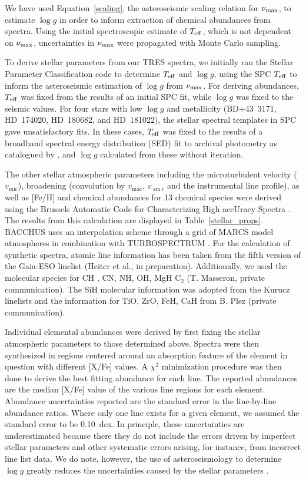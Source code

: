 \documentclass[modern]{aastex62}
\newcommand{\numax}{\mbox{$\nu_{\rm max}$}\xspace}
\newcommand{\teff}{\mbox{$T_{\rm eff}$}\xspace}
\newcommand{\logg}{\mbox{$\log g$}\xspace}
\begin{document}
We have used Equation~\ref{scaling}, the asteroseismic scaling relation for \numax \citep{1991ApJ...368..599B,KB95}, to estimate \logg in order to inform extraction of chemical abundances from spectra. Using the initial spectroscopic estimate of \teff, which is not dependent on \numax, uncertainties in \numax were propagated with Monte Carlo sampling. 

To derive stellar parameters from our TRES spectra, we initially ran the Stellar Parameter Classification code \citep[SPC:][]{spc} to determine \teff and \logg, using the SPC \teff to inform the asteroseismic estimation of \logg from \numax. For deriving abundances, \teff was fixed from the results of an initial SPC fit, while \logg was fixed to the seismic values. For four stars with low \logg and metallicity (BD+43~3171, HD~174020, HD~180682, and HD~181022), the stellar spectral templates in SPC gave unsatisfactory fits. In these cases, \teff was fixed to the results of a broadband spectral energy distribution (SED) fit to archival photometry as catalogued by \citet{Mcdonald2017}, and \logg calculated from these without iteration.

The other stellar atmospheric parameters including the microturbulent velocity ($v_{\text{mic}}$), broadening (convolution by $v_{\text{mac}}$, $v_{\sin{i}}$ and the instrumental line profile), as well as [Fe/H] and chemical abundances for 13 chemical species were derived using the Brussels Automatic Code for Characterizing High accUracy Spectra \citep[BACCHUS:][]{bacchus}. The results from this calculation are displayed in Table~\ref{stellar_props}. BACCHUS uses an interpolation scheme through a grid of MARCS model atmospheres \citep{Gustafsson2008} in combination with TURBOSPECTRUM \citep{Alvarez1998, Plez2012}. For the calculation of synthetic spectra, atomic line information has been taken from the fifth version of the Gaia-ESO linelist (Heiter et al., in preparation). Additionally, we used the molecular species for CH \citep{Masseron2014}, CN, NH, OH, MgH  C$_{2}$ (T. Masseron, private communication). The SiH molecular information was adopted from the Kurucz linelists and the information for TiO, ZrO, FeH, CaH from B. Plez (private communication). 

Individual elemental abundances were derived by first fixing the stellar atmospheric parameters to those determined above. Spectra were then synthesized in regions centered around an absorption feature of the element in question with different [X/Fe] values. A $\chi^2$ minimization procedure was then done to derive the best fitting abundance for each line. The reported abundances are the median [X/Fe] value of the various line regions for each element. Abundance uncertainties reported are the standard error in the line-by-line abundance ratios. Where only one line exists for a given element, we assumed the standard error to be 0.10~dex. In principle, these uncertainties are underestimated because there they do not include the errors driven by imperfect stellar parameters and other systematic errors arising, for instance, from incorrect line list data. We do note, however, the use of asteroseismology to determine \logg greatly reduces the uncertainties caused by the stellar parameters \citep[see][for a longer discussion on this]{hawkinsapogee}. 
\end{document}
